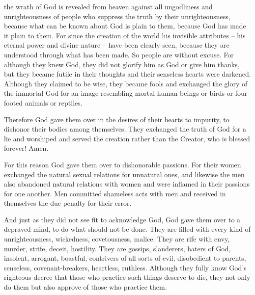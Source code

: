 {the wrath
of God
is revealed
from
heaven
against
all
ungodliness
and
unrighteousness
of people
who suppress
the truth
by
their unrighteousness,
because
what can be known
about God
is
plain
to
them,
because
God
has made
it plain
to them.
For
since
the creation
of the world
his
invisible attributes
– his
eternal
power
and
divine nature – have been clearly seen, because they are understood through what has been made. So people are without excuse.
For
although they knew
God,
they did
not
glorify
him as
God
or
give
him thanks,
but
they became futile
in
their
thoughts
and
their
senseless
hearts
were darkened.
Although they claimed
to be
wise,
they became fools
and
exchanged
the glory
of the immortal
God
for
an image
resembling
mortal
human beings
or
birds
or
four-footed animals
or
reptiles.
\par }{\PP {}Therefore
God
gave
them
over
in
the desires
of their
hearts
to
impurity,
to dishonor
their
bodies
among
themselves.
They
exchanged
the truth
of God
for
a lie
and
worshiped
and
served
the creation
rather than
the Creator,
who
is
blessed
forever! Amen.
\par }{\PP {}For
this reason
God
gave
them
over
to
dishonorable
passions.
For
their
women
exchanged
the natural
sexual relations
for
unnatural ones,
and
likewise
the men
also
abandoned
natural
relations
with women
and were inflamed
in
their
passions
for one another.
Men
committed
shameless acts
with
men
and
received
in
themselves
the due penalty
for their
error.
\par }{\PP {}And
just as
they did
not
see
fit
to
acknowledge
God,
God
gave
them
over
to
a depraved
mind,
to do
what should
not
be done.
They are filled
with every kind
of unrighteousness,
wickedness,
covetousness,
malice.
They are rife
with envy,
murder,
strife,
deceit,
hostility.
They are gossips,
slanderers,
haters of God,
insolent,
arrogant,
boastful,
contrivers
of all sorts of evil,
disobedient
to parents,
senseless,
covenant-breakers,
heartless,
ruthless.
Although
they fully know
God’s
righteous decree
that
those who practice
such things
deserve
to die,
they
not
only
do
them
but
also
approve
of those who practice them.

}
